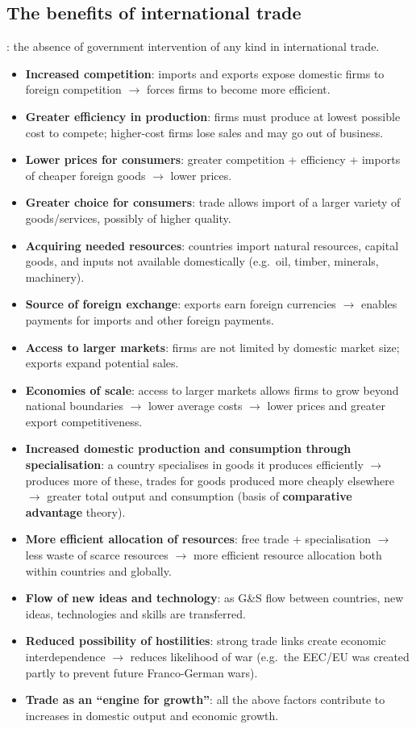 \subsection{The benefits of international trade}
: the absence of government intervention of any kind in international trade.
\begin{itemize}
  \item \textbf{Increased competition}: imports and exports expose domestic firms to foreign competition $\to$ forces firms to become more efficient.
  \item \textbf{Greater efficiency in production}: firms must produce at lowest possible cost to compete; higher-cost firms lose sales and may go out of business.
  \item \textbf{Lower prices for consumers}: greater competition + efficiency + imports of cheaper foreign goods $\to$ lower prices.
  \item \textbf{Greater choice for consumers}: trade allows import of a larger variety of goods/services, possibly of higher quality.
  \item \textbf{Acquiring needed resources}: countries import natural resources, capital goods, and inputs not available domestically (e.g.\ oil, timber, minerals, machinery).
  \item \textbf{Source of foreign exchange}: exports earn foreign currencies $\to$ enables payments for imports and other foreign payments.
  \item \textbf{Access to larger markets}: firms are not limited by domestic market size; exports expand potential sales.
  \item \textbf{Economies of scale}: access to larger markets allows firms to grow beyond national boundaries $\to$ lower average costs $\to$ lower prices and greater export competitiveness.
  \item \textbf{Increased domestic production and consumption through specialisation}: a country specialises in goods it produces efficiently $\to$ produces more of these, trades for goods produced more cheaply elsewhere $\to$ greater total output and consumption (basis of \textbf{comparative advantage} theory).
  \item \textbf{More efficient allocation of resources}: free trade + specialisation $\to$ less waste of scarce resources $\to$ more efficient resource allocation both within countries and globally.
  \item \textbf{Flow of new ideas and technology}: as G\&S flow between countries, new ideas, technologies and skills are transferred.
  \item \textbf{Reduced possibility of hostilities}: strong trade links create economic interdependence $\to$ reduces likelihood of war (e.g.\ the EEC/EU was created partly to prevent future Franco-German wars).
  \item \textbf{Trade as an ``engine for growth''}: all the above factors contribute to increases in domestic output and economic growth.
\end{itemize}
